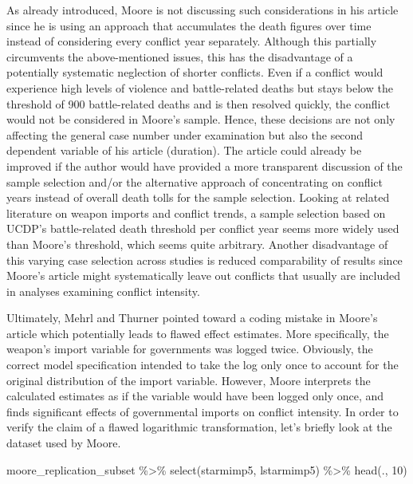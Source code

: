 \documentclass[
]{article}
\newenvironment{Shaded}{\begin{snugshade}}{\end{snugshade}}
\newcommand{\DecValTok}[1]{\textcolor[rgb]{0.00,0.00,0.81}{#1}}
\newcommand{\FunctionTok}[1]{\textcolor[rgb]{0.00,0.00,0.00}{#1}}
\newcommand{\NormalTok}[1]{#1}
\newcommand{\SpecialCharTok}[1]{\textcolor[rgb]{0.00,0.00,0.00}{#1}}
\begin{document}
As already introduced, Moore is not discussing such considerations in
his article since he is using an approach that accumulates the death
figures over time instead of considering every conflict year separately.
Although this partially circumvents the above-mentioned issues, this has
the disadvantage of a potentially systematic neglection of shorter
conflicts. Even if a conflict would experience high levels of violence
and battle-related deaths but stays below the threshold of 900
battle-related deaths and is then resolved quickly, the conflict would
not be considered in Moore's sample. Hence, these decisions are not only
affecting the general case number under examination but also the second
dependent variable of his article (duration). The article could already
be improved if the author would have provided a more transparent
discussion of the sample selection and/or the alternative approach of
concentrating on conflict years instead of overall death tolls for the
sample selection. Looking at related literature on weapon imports and
conflict trends, a sample selection based on UCDP's battle-related death
threshold per conflict year seems more widely used than Moore's
threshold, which seems quite arbitrary. Another disadvantage of this
varying case selection across studies is reduced comparability of
results since Moore's article might systematically leave out conflicts
that usually are included in analyses examining conflict intensity.

Ultimately, Mehrl and Thurner pointed toward a coding mistake in Moore's
article which potentially leads to flawed effect estimates. More
specifically, the weapon's import variable for governments was logged
twice. Obviously, the correct model specification intended to take the
log only once to account for the original distribution of the import
variable. However, Moore interprets the calculated estimates as if the
variable would have been logged only once, and finds significant effects
of governmental imports on conflict intensity. In order to verify the
claim of a flawed logarithmic transformation, let's briefly look at the
dataset used by Moore.

\begin{Shaded}
\begin{Highlighting}[]
\NormalTok{moore\_replication\_subset }\SpecialCharTok{\%\textgreater{}\%}
  \FunctionTok{select}\NormalTok{(starmimp5, lstarmimp5) }\SpecialCharTok{\%\textgreater{}\%} 
  \FunctionTok{head}\NormalTok{(., }\DecValTok{10}\NormalTok{)}
\end{Highlighting}
\end{Shaded}
\end{document}
